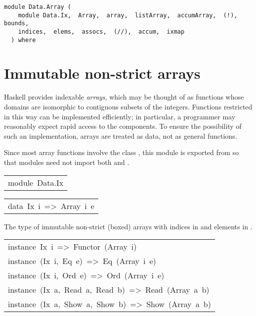 \label{module:Data.Array}
\haddockbeginheader
{\haddockverb\begin{verbatim}
module Data.Array (
    module Data.Ix,  Array,  array,  listArray,  accumArray,  (!),  bounds, 
    indices,  elems,  assocs,  (//),  accum,  ixmap
  ) where\end{verbatim}}
\haddockendheader

\section{Immutable non-strict arrays
}
Haskell provides indexable \emph{arrays}, which may be thought of as functions
whose domains are isomorphic to contiguous subsets of the integers.
Functions restricted in this way can be implemented efficiently;
in particular, a programmer may reasonably expect rapid access to
the components.  To ensure the possibility of such an implementation,
arrays are treated as data, not as general functions.
\par
Since most array functions involve the class , this module is exported
from  so that modules need not import both  and
.
\par

\begin{haddockdesc}
\item[\begin{tabular}{@{}l}
module\ Data.Ix
\end{tabular}]
\end{haddockdesc}
\begin{haddockdesc}
\item[\begin{tabular}{@{}l}
data\ Ix\ i\ =>\ Array\ i\ e
\end{tabular}]\haddockbegindoc
The type of immutable non-strict (boxed) arrays
 with indices in  and elements in .
\par

\end{haddockdesc}
\begin{haddockdesc}
\item[\begin{tabular}{@{}l}
instance\ Ix\ i\ =>\ Functor\ (Array\ i)\\instance\ (Ix\ i,\ Eq\ e)\ =>\ Eq\ (Array\ i\ e)\\instance\ (Ix\ i,\ Ord\ e)\ =>\ Ord\ (Array\ i\ e)\\instance\ (Ix\ a,\ Read\ a,\ Read\ b)\ =>\ Read\ (Array\ a\ b)\\instance\ (Ix\ a,\ Show\ a,\ Show\ b)\ =>\ Show\ (Array\ a\ b)
\end{tabular}]
\end{haddockdesc}
